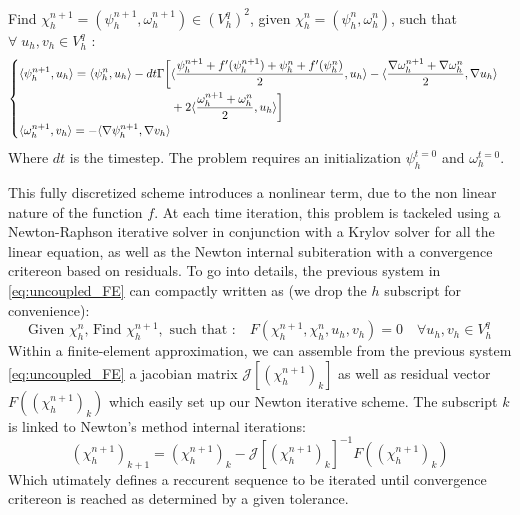 \documentclass{article}
\begin{document}
\begin{mybox}{}
   Find $\chi_h^{n+1}=(\psi_h^{n+1},\omega_h^{n+1})\in (V^q_h)^2$, given $\chi_h^{n}=(\psi_h^{n},\omega_h^{n})$, such that $\forall \; u_h, v_h \in V^q_h$ :
   \begin{equation}\label{eq:uncoupled_FE}
      \begin{cases}
          \begin{aligned}
              \langle{\psi_h^{n+1}},{u_h}\rangle = \langle{\psi_h^{n}},{u_h}\rangle 
              - dt \Gamma \bigg[&
                  \langle{\frac{\psi_h^{n+1} + f'(\psi_h^{n+1}) + \psi_h^{n} + f'(\psi_h^{n})}{2}},{u_h}\rangle- \langle{\frac{\nabla \omega_h^{n+1}+ \nabla \omega_h^{n}}{2}},{\nabla u_h}\rangle\\
                  &+ 2 \langle{\frac{\omega_h^{n+1} + \omega_h^{n}}{2}},{u_h}\rangle 
              \bigg]
          \end{aligned} \\
          \langle{\omega_h^{n+1}},{v_h}\rangle = -\langle{\nabla \psi_h^{n+1}},{\nabla v_h}\rangle
      \end{cases}
  \end{equation}
Where $dt$ is the timestep. The problem requires an initialization $\psi_h^{t=0}$ and $\omega_h^{t=0}$.
\end{mybox}
This fully discretized scheme introduces a nonlinear term, due to the non linear nature of the function $f$. At each time iteration, this problem is tackeled using a Newton-Raphson iterative solver in conjunction with a Krylov solver for all the linear equation, as well as the Newton internal subiteration with a convergence critereon based on residuals. To go into details, the previous system in \cref{eq:uncoupled_FE} can compactly written as (we drop the $h$ subscript for convenience):
\begin{equation}
   \text{Given } \chi^n_h \text{,  Find } \chi^{n+1}_h,\text{ such that :} \quad F(\chi^{n+1}_h,\chi^{n}_h,u_h,v_h)=0 \quad \forall u_h,v_h \in V_h^q
\end{equation}
Within a finite-element approximation, we can assemble from the previous system \cref{eq:uncoupled_FE} a jacobian matrix $\mathcal{J}\left[\left(\chi^{n+1}_h\right)_{k}\right]$ as well as residual vector $F(\left(\chi^{n+1}_h\right)_{k})$ which easily set up our Newton iterative scheme. The subscript $k$ is linked to Newton's method internal iterations:
\begin{equation}\label{eq:NewtonSH_FE_mixed}
   \left(\chi^{n+1}_h\right)_{k+1}=\left(\chi^{n+1}_h\right)_{k}- \mathcal{J}\left[\left(\chi^{n+1}_h\right)_{k}\right]^{-1}F(\left(\chi^{n+1}_h\right)_{k})
\end{equation}
Which utimately defines a reccurent sequence to be iterated until convergence critereon is reached as determined by a given tolerance.
\end{document}

